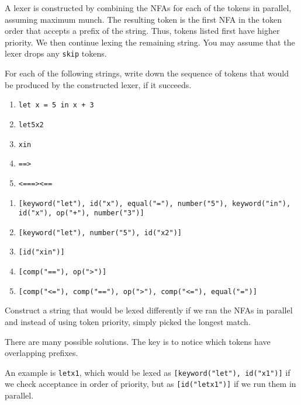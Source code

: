 A lexer is constructed by combining the NFAs for each of the tokens in parallel,
assuming maximum munch. The resulting token is the first NFA in the token order
that accepts a prefix of the string. Thus, tokens listed first have higher
priority. We then continue lexing the remaining string. You may assume that the
lexer drops any \texttt{skip} tokens.

\begin{exercise}{}

  For each of the following strings, write down the sequence of tokens that
  would be produced by the constructed lexer, if it succeeds. 

  \begin{enumerate}
    \item \texttt{let x = 5 in x + 3}
    \item \texttt{let5x2}
    \item \texttt{xin}
    \item \texttt{==>}
    \item \texttt{<===><==}
  \end{enumerate}

  \begin{solution}
    \begin{enumerate}
      \item \texttt{[keyword("let"), id("x"), equal("="), number("5"), keyword("in"), id("x"), op("+"), number("3")]}
      \item \texttt{[keyword("let"), number("5"), id("x2")]}
      \item \texttt{[id("xin")]}
      \item \texttt{[comp("=="), op(">")]}
      \item \texttt{[comp("<="), comp("=="), op(">"), comp("<="), equal("=")]}
    \end{enumerate}
  \end{solution}
  
\end{exercise}


\begin{exercise}{}
  Construct a string that would be lexed differently if we ran the NFAs in parallel
  and instead of using token priority, simply picked the longest match.

  \begin{solution}
    There are many possible solutions. The key is to notice which tokens have
    overlapping prefixes.

    An example is \texttt{letx1}, which would be lexed as
    \texttt{[keyword("let"), id("x1")]} if we check acceptance in order of
    priority, but as \texttt{[id("letx1")]} if we run them in parallel.
  \end{solution}
\end{exercise}
  
  